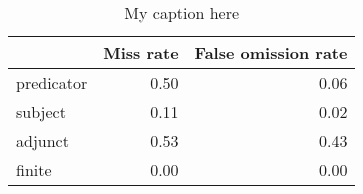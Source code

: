\begin{table}[!ht]
\centering
\begin{tabular}{lrr}
\toprule
{} &  Miss rate &  False omission rate \\
\midrule
predicator &       0.50 &                 0.06 \\
subject    &       0.11 &                 0.02 \\
adjunct    &       0.53 &                 0.43 \\
finite     &       0.00 &                 0.00 \\
\bottomrule
\end{tabular}
\caption{My caption here}
\label{tab:unit-elements-ocd-combined-errors}
\end{table}
